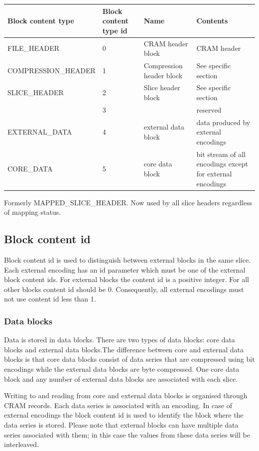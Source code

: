 \documentclass[a4paper]{article}
\begin{document}
\begin{threeparttable}[t]
\begin{tabular}{|>{\raggedright}p{143pt}|>{\raggedright}p{45pt}|>{\raggedright}p{116pt}|>{\raggedright}p{114pt}|}
\hline
\textbf{Block content type} & \textbf{Block content type id} & \textbf{Name} & \textbf{Contents}\tabularnewline
\hline
FILE\_HEADER & 0 & CRAM header block & CRAM header\tabularnewline
\hline
COMPRESSION\_HEADER & 1 & Compression header block & See specific section\tabularnewline
\hline
SLICE\_HEADER\tnote{a} & 2 & Slice header block & See specific section\tabularnewline
\hline
 & 3 &  & reserved\tabularnewline
\hline
EXTERNAL\_DATA & 4 & external data block & data produced by external encodings\tabularnewline
\hline
CORE\_DATA & 5 & core data block & bit stream of all encodings except for external encodings\tabularnewline
\hline
\end{tabular}
\begin{tablenotes}
\item[a] Formerly MAPPED\_SLICE\_HEADER.  Now used by all slice headers regardless of mapping status.
\end{tablenotes}
\end{threeparttable}

\subsection{\textbf{Block content id}}

Block content id is used to distinguish between external blocks in the same slice. 
Each external encoding has an id parameter which must be one of the external block 
content ids. For external blocks the content id is a positive integer. For all 
other blocks content id should be 0. Consequently, all external encodings must 
not use content id less than 1. 

\subsubsection*{Data blocks}

Data is stored in data blocks. There are two types of data blocks: core data blocks 
and external data blocks.The difference between core and external data blocks is 
that core data blocks consist of data series that are compressed using bit encodings 
while the external data blocks are byte compressed. One core data block and any 
number of external data blocks are associated with each slice.

Writing to and reading from core and external data blocks is organised through 
CRAM records. Each data series is associated with an encoding. In case of external 
encodings the block content id is used to identify the block where the data series 
is stored. Please note that external blocks can have multiple data series associated 
with them; in this case the values from these data series will be interleaved. 
\end{document}
